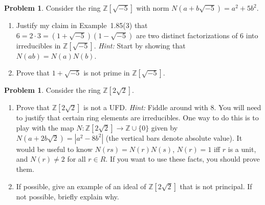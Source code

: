 \documentclass[11pt]{scrartcl}
\theoremstyle{definition}
\newtheorem{problem}[theorem]{Problem}
\begin{document}
\begin{problem}
Consider the ring $\mathbb{Z}[\sqrt{-5}]$ with norm $N(a+b\sqrt{-5})=a^2+5b^2$.  
\begin{enumerate}[label=\rm{(\alph*)}]
\item Justify my claim in Example~1.85(3) that $6=2\cdot 3=(1+\sqrt{-5})(1-\sqrt{-5})$ are two distinct factorizations of 6 into irreducibles in $\mathbb{Z}[\sqrt{-5}]$. \emph{Hint:} Start by showing that $N(ab)=N(a)N(b)$.
\item Prove that $1+\sqrt{-5}$ is not prime in $\mathbb{Z}[\sqrt{-5}]$.
\end{enumerate}
\end{problem}

\begin{problem}
Consider the ring $\mathbb{Z}[2\sqrt{2}]$.
\begin{enumerate}[label=\rm{(\alph*)}]
\item Prove that $\mathbb{Z}[2\sqrt{2}]$ is not a UFD. \emph{Hint:} Fiddle around with 8.  You will need to justify that certain ring elements are irreducibles.  One way to do this is to play with the map $N:\mathbb{Z}[2\sqrt{2}]\to \mathbb{Z}\cup\{0\}$ given by $N(a+2b\sqrt{2})=|a^2-8b^2|$ (the vertical bars denote absolute value). It would be useful to know $N(rs)=N(r)N(s)$, $N(r)=1$ iff $r$ is a unit, and $N(r)\neq 2$ for all $r\in R$. If you want to use these facts, you should prove them.
\item If possible, give an example of an ideal of $\mathbb{Z}[2\sqrt{2}]$ that is not principal.  If not possible, briefly explain why.
\end{enumerate}
\end{problem}
\end{document}
